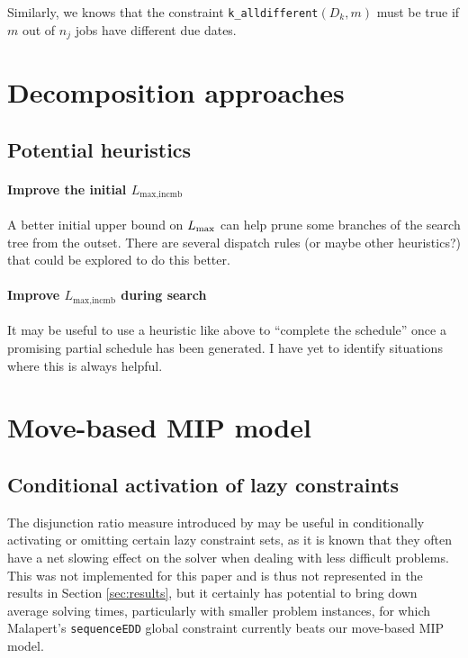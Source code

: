 \documentclass[13pt, letterpaper, oneside]{book}
\begin{document}
Similarly, we knows that the constraint \texttt{k\_alldifferent}$(D_k, m)$ must
be true if $m$ out of $n_j$ jobs have different due dates.

\section{Decomposition approaches}
\subsection{Potential heuristics}
\paragraph{Improve the initial $L_{\text{max,incmb}}$} A better initial
upper bound on $L_{\text{max}}$ can help prune some branches of the search tree from the
outset. There are several dispatch rules (or maybe other heuristics?) that could
be explored to do this better.
\paragraph{Improve $L_{\text{max,incmb}}$ during search} It may be useful to
use a heuristic like above to ``complete the schedule'' once a promising partial
schedule has been generated. I have yet to identify situations where this is
always helpful.


\section{Move-based MIP model}
\subsection{Conditional activation of lazy constraints}
The disjunction ratio measure introduced by \citet{baptistelepape} may be useful
in conditionally activating or omitting certain lazy constraint sets, as it is
known that they often have a net slowing effect on the solver when dealing with
less difficult problems. This was not implemented for this paper and is thus not
represented in the results in Section \ref{sec:results}, but it certainly has
potential to bring down average solving times, particularly with smaller problem
instances, for which Malapert's \texttt{sequenceEDD} global constraint currently
beats our move-based MIP model.
\end{document}

